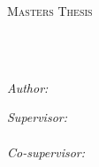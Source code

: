 \documentclass[11pt,twoside,english,singlespacing,headsepline,consistentlayout]{auxiliary/si-msc-thesis}
\author{Carmen \textsc{Armenti}} %
\theoremstyle{definition}
\begin{document}
\frontmatter
\pagestyle{plain}


%
\begin{titlepage}
    \begin{center}
    
    \vspace*{.02\textheight}
    {\scshape\LARGE \univname\par}\vspace{0.5cm} %
    {\scshape\LARGE \deptname\par}\vspace{0.5cm} 
    \textsc{\Large Masters Thesis}\\[0.5cm] %
    
    \HRule \\[0.1cm] %
    {\huge \bfseries \ttitle\par}\vspace{0.4cm} %
    \HRule \\[1.2cm] %
     
    \begin{minipage}[t]{0.4\textwidth}
    \begin{flushleft} \large
    \emph{Author:}\\
    \authorname
    \end{flushleft}
    \end{minipage}
    \begin{minipage}[t]{0.4\textwidth}
    \begin{flushright} \large
    \emph{Supervisor:} \\
    \href{https://dibt.unimol.it/staff/oliveto/}{\supname}\\[0.5cm] %
    \emph{{Co-supervisor:}} \\
    \href{https://www.inf.usi.ch/faculty/bavota/#}{\cosupname}\\[0.5cm]
    \end{flushright}
    \end{minipage}\\[2cm]
     
    \vfill
    

\end{center}
\end{titlepage}
\end{document}
